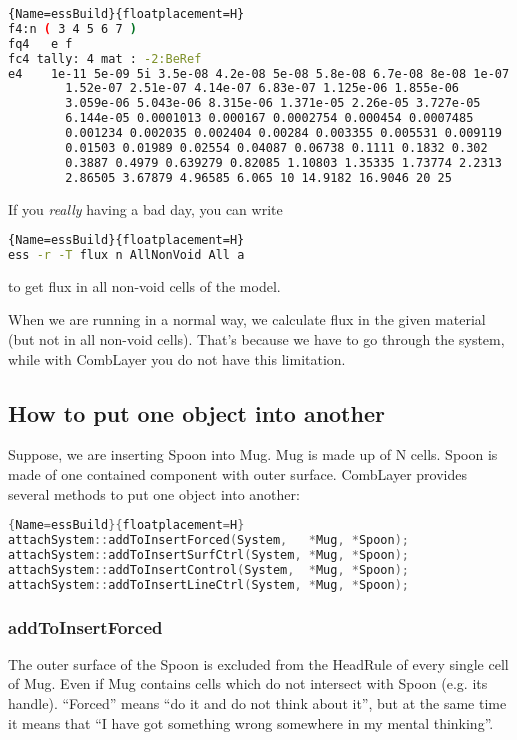 \begin{lstlisting}[language=bash]{Name=essBuild}{floatplacement=H}
f4:n ( 3 4 5 6 7 )
fq4   e f
fc4 tally: 4 mat : -2:BeRef
e4    1e-11 5e-09 5i 3.5e-08 4.2e-08 5e-08 5.8e-08 6.7e-08 8e-08 1e-07
        1.52e-07 2.51e-07 4.14e-07 6.83e-07 1.125e-06 1.855e-06
        3.059e-06 5.043e-06 8.315e-06 1.371e-05 2.26e-05 3.727e-05
        6.144e-05 0.0001013 0.000167 0.0002754 0.000454 0.0007485
        0.001234 0.002035 0.002404 0.00284 0.003355 0.005531 0.009119
        0.01503 0.01989 0.02554 0.04087 0.06738 0.1111 0.1832 0.302
        0.3887 0.4979 0.639279 0.82085 1.10803 1.35335 1.73774 2.2313
        2.86505 3.67879 4.96585 6.065 10 14.9182 16.9046 20 25
\end{lstlisting}

If you {\em really} having a bad day, you can write
\begin{lstlisting}[language=bash]{Name=essBuild}{floatplacement=H}
ess -r -T flux n AllNonVoid All a
\end{lstlisting}
to get flux in all non-void cells of the model.

When we are running \cinder in a normal way, we calculate flux in the given material (but not in all non-void cells).
That's because we have to go through the \cinder system, while with CombLayer you do not have this limitation.


\subsection{How to put one object into another}

Suppose, we are inserting Spoon into Mug.
Mug is made up of N cells. Spoon is made of one contained component with outer surface.
CombLayer provides several methods to put one object into another:

\begin{lstlisting}[language=C++]{Name=essBuild}{floatplacement=H}
attachSystem::addToInsertForced(System,   *Mug, *Spoon);
attachSystem::addToInsertSurfCtrl(System, *Mug, *Spoon);
attachSystem::addToInsertControl(System,  *Mug, *Spoon);
attachSystem::addToInsertLineCtrl(System, *Mug, *Spoon);
\end{lstlisting}

\subsubsection{addToInsertForced}
The outer surface of the Spoon is excluded from the HeadRule of every single cell of Mug.
Even if Mug contains cells which do not intersect with Spoon (e.g. its handle).
``Forced'' means ``do it and do not think about it'', but at the same time it means that ``I have got something wrong somewhere in my mental thinking''.


